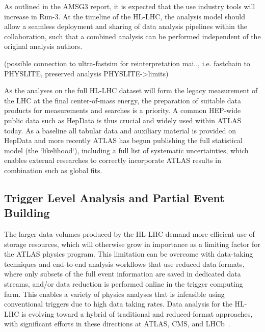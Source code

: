 As outlined in the AMSG3 report, it is expected that the use industry tools will increase in Run-3. At the timeline of the HL-LHC, the analysis model should allow a seamless deployment and sharing of data analysis pipelines within the collaboration, such that a combined analysis can be performed independent of the original analysis authors.

(possible connection to ultra-fastsim for reinterpretation mai.., i.e. fastchain to PHYSLITE, preserved analysis PHYSLITE->limits)

As the analyses on the full HL-LHC dataset will form the legacy measurement of the LHC at the final center-of-mass energy, the preparation of suitable data products for measurements and searches is a priority. A common HEP-wide public data such as HepData is thus crucial and widely used within ATLAS today. As a baseline all tabular data and auxiliary material is provided on HepData and more recently ATLAS has begun publishing the full statistical model (the `likelihood`), including a full list of systematic uncertainties, which enables external researches to correctly incorporate ATLAS results in combination such as global fits.

\subsection{Trigger Level Analysis and Partial Event Building}



The larger data volumes produced by the HL-LHC demand more efficient use of storage resources, which will otherwise grow in importance as a limiting factor for the ATLAS physics program.
This limitation can be overcome with data-taking techniques and end-to-end analysis workflows that use reduced data formats, where only subsets of the full event information are saved in dedicated data streams, and/or data reduction is performed online in the trigger computing farm.
This enables a variety of physics analyses that is infeasible using conventional triggers due to high data taking rates.
Data analysis for the HL-LHC is evolving toward a hybrid of traditional and reduced-format approaches, with significant efforts in these directions at ATLAS, CMS, and LHCb~\cite{??,HSF}.


